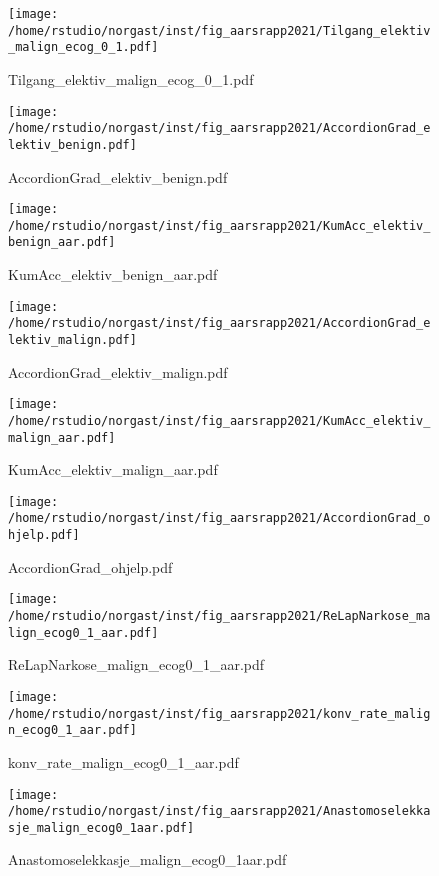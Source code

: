 \documentclass[norsk,a4paper]{article}\usepackage[]{graphicx}\usepackage[]{color}
\begin{document}
\begin{figure}[ht]
\centering
\texttt{[image: /home/rstudio/norgast/inst/fig\_aarsrapp2021/Tilgang\_elektiv\_malign\_ecog\_0\_1.pdf]}
\caption{Tilgang\_elektiv\_malign\_ecog\_0\_1.pdf}
\end{figure}

\begin{figure}[ht]
\centering
\texttt{[image: /home/rstudio/norgast/inst/fig\_aarsrapp2021/AccordionGrad\_elektiv\_benign.pdf]}
\caption{AccordionGrad\_elektiv\_benign.pdf}
\end{figure}

\begin{figure}[ht]
\centering
\texttt{[image: /home/rstudio/norgast/inst/fig\_aarsrapp2021/KumAcc\_elektiv\_benign\_aar.pdf]}
\caption{KumAcc\_elektiv\_benign\_aar.pdf}
\end{figure}

\begin{figure}[ht]
\centering
\texttt{[image: /home/rstudio/norgast/inst/fig\_aarsrapp2021/AccordionGrad\_elektiv\_malign.pdf]} %
\caption{AccordionGrad\_elektiv\_malign.pdf}
\end{figure}

\begin{figure}[ht]
\centering
\texttt{[image: /home/rstudio/norgast/inst/fig\_aarsrapp2021/KumAcc\_elektiv\_malign\_aar.pdf]} %
\caption{KumAcc\_elektiv\_malign\_aar.pdf}
\end{figure}

\begin{figure}[ht]
\centering
\texttt{[image: /home/rstudio/norgast/inst/fig\_aarsrapp2021/AccordionGrad\_ohjelp.pdf]} %
\caption{AccordionGrad\_ohjelp.pdf}
\end{figure}

\begin{figure}[ht]
\centering
\texttt{[image: /home/rstudio/norgast/inst/fig\_aarsrapp2021/ReLapNarkose\_malign\_ecog0\_1\_aar.pdf]}
\caption{ReLapNarkose\_malign\_ecog0\_1\_aar.pdf}
\end{figure}

\begin{figure}[ht]
\centering
\texttt{[image: /home/rstudio/norgast/inst/fig\_aarsrapp2021/konv\_rate\_malign\_ecog0\_1\_aar.pdf]}
\caption{konv\_rate\_malign\_ecog0\_1\_aar.pdf}
\end{figure}

\begin{figure}[ht]
\centering
\texttt{[image: /home/rstudio/norgast/inst/fig\_aarsrapp2021/Anastomoselekkasje\_malign\_ecog0\_1aar.pdf]}
\caption{Anastomoselekkasje\_malign\_ecog0\_1aar.pdf}
\end{figure}
\end{document}

